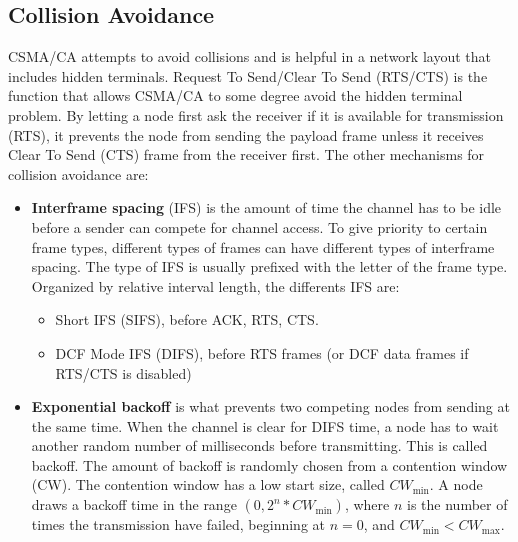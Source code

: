      \subsection{Collision Avoidance}
CSMA/CA attempts to avoid collisions and is helpful in a network layout that includes hidden terminals. Request To Send/Clear To Send (RTS/CTS)
	is the function that allows CSMA/CA to some degree avoid the hidden terminal problem. By letting a node first ask the receiver if it is
	available for transmission (RTS), it prevents the node from sending the payload frame unless it receives Clear To Send (CTS) frame from the receiver first.
	The other mechanisms for collision avoidance are: 
	\begin{itemize}	
	\item \textbf{Interframe spacing} (IFS) is the amount of time the channel has to be idle before a sender can compete for channel access. 
	To give priority to certain frame types, different types of frames can have different types of interframe spacing. The type of IFS is usually 
	prefixed with the letter of the frame type. Organized by relative interval length, the differents IFS are:
	\begin{itemize} 
	\item Short IFS (SIFS), before ACK, RTS, CTS.  
	\item DCF Mode IFS (DIFS), before RTS frames (or DCF data frames if RTS/CTS is disabled)

	\end{itemize}
	\item \textbf{Exponential backoff} is what prevents two competing nodes from sending at the same time. When the channel is clear
	for DIFS time, a node has to wait another  random number of milliseconds before transmitting. This is called backoff.
	The amount of backoff is randomly chosen from a contention window (CW). The contention window has a low start size,
	called $CW_{\text{min}}$. A node draws a backoff time in the range $(0, 2^n*CW_{\text{min}})$, where $n$ is the number 
	of times the transmission have failed, beginning at $n=0$, and $CW_{\text{min}}<CW_{\text{max}}$.
	\end{itemize}

